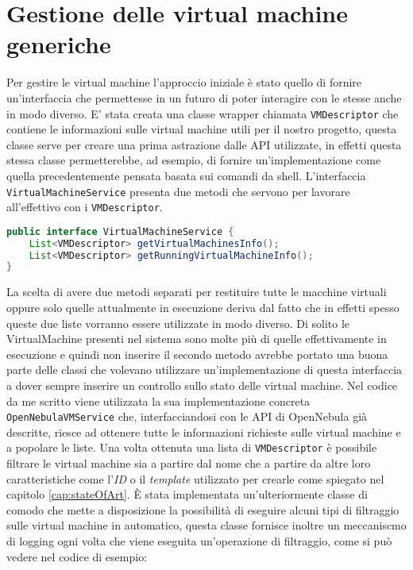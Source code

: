 \section{Gestione delle virtual machine generiche}
Per gestire le virtual machine l'approccio iniziale è stato quello di fornire un'interfaccia che permettesse in un futuro di poter interagire con le stesse anche in modo diverso.
E' stata creata una classe wrapper chiamata \texttt{VMDescriptor} che contiene le informazioni sulle virtual machine utili per il nostro progetto, questa classe serve per creare una prima astrazione dalle API utilizzate, in effetti questa stessa classe permetterebbe, ad esempio, di fornire un'implementazione come quella precedentemente pensata basata sui comandi da shell.
L'interfaccia \texttt{VirtualMachineService} presenta due metodi che servono per lavorare all'effettivo con i \texttt{VMDescriptor}.
\begin{lstlisting}[language=Java, caption=VirtualMachineService, label=code:VirtualMachineService, xleftmargin=1em]
public interface VirtualMachineService {
    List<VMDescriptor> getVirtualMachinesInfo();
    List<VMDescriptor> getRunningVirtualMachineInfo();
}
\end{lstlisting}
La scelta di avere due metodi separati per restituire tutte le macchine virtuali oppure solo quelle attualmente in esecuzione deriva dal fatto che in effetti spesso queste due liste vorranno essere utilizzate in modo diverso. Di solito le VirtualMachine presenti nel sistema sono molte più di quelle effettivamente in esecuzione e quindi non inserire il secondo metodo avrebbe portato una buona parte delle classi che volevano utilizzare un'implementazione di questa interfaccia a dover sempre inserire un controllo sullo stato delle virtual machine.
Nel codice da me scritto viene utilizzata la sua implementazione concreta \texttt{OpenNebulaVMService} che, interfacciandosi con le API di OpenNebula già descritte, riesce ad ottenere tutte le informazioni richieste sulle virtual machine e a popolare le liste.
Una volta ottenuta una lista di \texttt{VMDescriptor} è possibile filtrare le virtual machine sia a partire dal nome che a partire da altre loro caratteristiche come l'\emph{ID} o il \emph{template} utilizzato per crearle come spiegato nel capitolo \ref{cap:stateOfArt}.
È stata implementata un'ulteriormente classe di comodo che mette a disposizione la possibilità di eseguire alcuni tipi di filtraggio sulle virtual machine in automatico, questa classe fornisce inoltre un meccaniscmo di logging ogni volta che viene eseguita un'operazione di filtraggio, come si può vedere nel codice di esempio:
